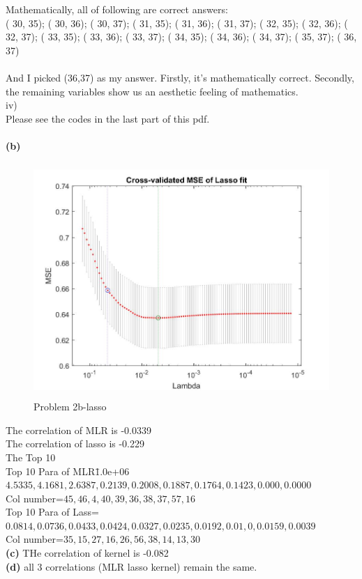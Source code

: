 \documentclass[11pt]{scrartcl}
\begin{document}
Mathematically, all of following are correct answers:\\
( 30, 35); ( 30, 36); ( 30, 37); ( 31, 35); ( 31, 36); ( 31, 37); ( 32, 35); ( 32, 36); ( 32, 37); ( 33, 35); ( 33, 36); ( 33, 37); ( 34, 35); ( 34, 36); ( 34, 37); ( 35, 37); ( 36, 37)\\
\\
And I picked (36,37) as my answer. Firstly, it's mathematically correct. Secondly, the remaining variables show us an aesthetic feeling of mathematics.\\
iv)\\
Please see the codes in the last part of this pdf.\\
\\
\textbf{(b)}\\
\begin{figure} 
	\includegraphics[width=5.5in,height=3.5in]{Q1b.jpg}
	\caption{Problem 2b-lasso}
\end{figure}
The correlation of MLR is -0.0339\\
The correlation of lasso is -0.229\\
The Top 10\\
Top 10 Para of MLR\=1.0e+06
\(4.5335,4.1681,2.6387,0.2139,0.2008,0.1887,0.1764,0.1423,0.000,0.0000\)\\
Col number=\(45,46,4,40,39,36,38,37,57,16\)\\
Top 10 Para of Lass=\(0.0814,0.0736,0.0433,0.0424,0.0327,0.0235,0.0192,0.01,0,0.0159,0.0039\)\\
Col number=\(35,15,27,16,26,56,38,14,13,30\)\\
\textbf{(c)}
THe correlation of kernel is -0.082\\
\textbf{(d)}
all 3 correlations (MLR lasso kernel) remain the same.\\
\end{document}
